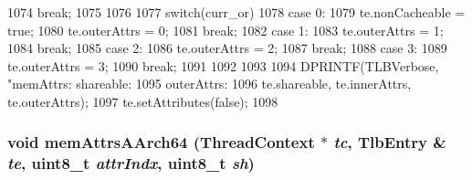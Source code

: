 \begin{DoxyCode}
{{{{1074                 break;
1075             }
1076 
1077             switch(curr_or) {
1078               case 0:
1079                 te.nonCacheable = true;
1080                 te.outerAttrs = 0;
1081                 break;
1082               case 1:
1083                 te.outerAttrs = 1;
1084                 break;
1085               case 2:
1086                 te.outerAttrs = 2;
1087                 break;
1088               case 3:
1089                 te.outerAttrs = 3;
1090                 break;
1091             }
1092         }
1093     }
1094     DPRINTF(TLBVerbose, "memAttrs: shareable: %
1095             outerAttrs: %
1096             te.shareable, te.innerAttrs, te.outerAttrs);
1097     te.setAttributes(false);
1098 }
\end{DoxyCode}
\hypertarget{classArmISA_1_1TableWalker_ae90661ceebb345173d8a0e9306fa9a82}{
\subsubsection[{memAttrsAArch64}]{\setlength{\rightskip}{0pt plus 5cm}void memAttrsAArch64 ({\bf ThreadContext} $\ast$ {\em tc}, \/  {\bf TlbEntry} \& {\em te}, \/  uint8\_\-t {\em attrIndx}, \/  uint8\_\-t {\em sh})}}
\label{classArmISA_1_1TableWalker_ae90661ceebb345173d8a0e9306fa9a82}



